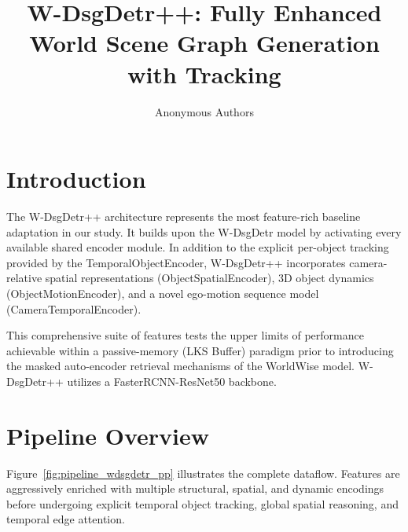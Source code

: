\documentclass{article}
\title{W-DsgDetr++: Fully Enhanced World Scene Graph Generation with Tracking}
\author{Anonymous Authors}
\begin{document}
\maketitle

\section{Introduction}
\label{sec:intro}

The W-DsgDetr++ architecture represents the most feature-rich baseline adaptation in our study. It builds upon the W-DsgDetr model by activating every available shared encoder module. In addition to the explicit per-object tracking provided by the TemporalObjectEncoder, W-DsgDetr++ incorporates camera-relative spatial representations (ObjectSpatialEncoder), 3D object dynamics (ObjectMotionEncoder), and a novel ego-motion sequence model (CameraTemporalEncoder). 

This comprehensive suite of features tests the upper limits of performance achievable within a passive-memory (LKS Buffer) paradigm prior to introducing the masked auto-encoder retrieval mechanisms of the WorldWise model. W-DsgDetr++ utilizes a FasterRCNN-ResNet50 backbone.

\section{Pipeline Overview}
\label{sec:pipeline}

Figure~\ref{fig:pipeline_wdsgdetr_pp} illustrates the complete dataflow. Features are aggressively enriched with multiple structural, spatial, and dynamic encodings before undergoing explicit temporal object tracking, global spatial reasoning, and temporal edge attention.
\end{document}
